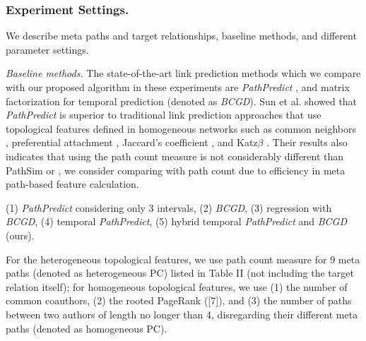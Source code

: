 
\subsubsection{Experiment Settings.} We describe meta paths and target relationships, baseline methods, and different parameter settings.

\textit{Baseline methods.} The state-of-the-art link prediction methods which we compare with our proposed algorithm in these experiments are \textit{PathPredict} \cite{sun2011ASONAM}, and matrix factorization for temporal prediction \cite{Zhu2016} (denoted as \textit{BCGD}). Sun et al. \cite{sun2011ASONAM} showed that \textit{PathPredict} is superior to traditional link prediction approaches that use topological features defined in homogeneous networks such as common neighbors \cite{newman2001clustering}, preferential attachment \cite{newman2001clustering}, Jaccard's coefficient \cite{liben2007link}, and Katz$\beta$ \cite{katz1953new}. Their results also indicates that using the path count measure is not considerably different than PathSim or , we consider comparing with path count due to efficiency in meta path-based feature calculation.


(1) \textit{PathPredict} considering only 3 intervals, (2) \textit{BCGD}, (3) regression with \textit{BCGD}, (4) temporal \textit{PathPredict}, (5) hybrid temporal \textit{PathPredict} and \textit{BCGD} (ours).



For the heterogeneous topological features, we use path count measure for 9 meta paths (denoted as heterogeneous PC) listed in Table II (not including the target relation itself); for homogeneous topological features, we use (1) the number of common coauthors, (2) the rooted PageRank ([7]), and (3) the number of paths between two authors of length no longer than 4, disregarding their different meta paths (denoted as homogeneous PC).

